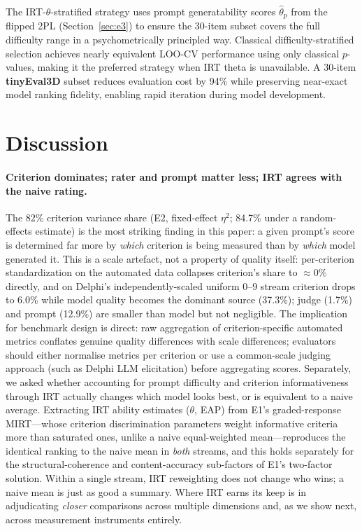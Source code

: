 \documentclass[10pt]{article}
\begin{document}
The IRT-$\theta$-stratified strategy uses prompt generatability scores
$\hat{\theta}_p$ from the flipped 2PL (Section~\ref{sec:e3}) to ensure
the 30-item subset covers the full difficulty range in a
psychometrically principled way.
Classical difficulty-stratified selection achieves nearly equivalent LOO-CV
performance using only classical $p$-values, making it the preferred strategy
when IRT theta is unavailable.
A 30-item \textbf{tinyEval3D} subset reduces evaluation cost by 94\% while
preserving near-exact model ranking fidelity, enabling rapid iteration during
model development.

\section{Discussion}
\label{sec:discussion}

\paragraph{Criterion dominates; rater and prompt matter less; IRT agrees
with the naive rating.}
The 82\% criterion variance share (E2, fixed-effect $\eta^2$; 84.7\% under a
random-effects estimate) is the most striking finding in this paper: a
given prompt's score is determined far more by \emph{which} criterion is
being measured than by \emph{which} model generated it.
This is a scale artefact, not a property of quality itself: per-criterion
standardization on the automated data collapses criterion's share to
$\approx$0\% directly, and on Delphi's independently-scaled uniform 0--9
stream criterion drops to 6.0\% while model quality becomes the dominant
source (37.3\%); judge (1.7\%) and prompt (12.9\%) are smaller than model
but not negligible.
The implication for benchmark design is direct: raw aggregation of
criterion-specific automated metrics conflates genuine quality differences
with scale differences; evaluators should either normalise metrics per
criterion or use a common-scale judging approach (such as Delphi LLM
elicitation) before aggregating scores.
Separately, we asked whether accounting for prompt difficulty and
criterion informativeness through IRT actually changes which model looks
best, or is equivalent to a naive average. Extracting IRT ability
estimates ($\theta$, EAP) from E1's graded-response MIRT---whose criterion
discrimination parameters weight informative criteria more than saturated
ones, unlike a naive equal-weighted mean---reproduces the identical
ranking to the naive mean in \emph{both} streams, and this holds
separately for the structural-coherence and content-accuracy sub-factors
of E1's two-factor solution. Within a single stream, IRT reweighting does
not change who wins; a naive mean is just as good a summary. Where IRT
earns its keep is in adjudicating \emph{closer} comparisons across
multiple dimensions and, as we show next, across measurement instruments
entirely.
\end{document}

